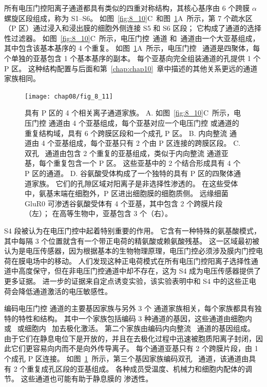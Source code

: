 所有电压门控阳离子通道都具有类似的四重对称结构，其核心基序由 6 个跨膜 $\alpha$ 螺旋区段组成，称为 S1–S6。
如图~\ref{fig:8_10}C~和图~\ref{fig:8_11}A~所示，第 7 个疏水区（P 区）通过浸入和浸出膜的细胞外侧连接 S5 和 S6 区段；
它构成了通道的选择性过滤器。
如图~\ref{fig:8_10}C~所示，电压门控~通道 和~通道由一个大亚基组成，其中包含该基本基序的 4 个重复。
如图~\ref{fig:8_11}A~所示，电压门控~ 通道是四聚体，每个单独的亚基包含 1 个基本基序的副本。
每个亚基向完全组装通道的孔提供 1 个 P 区。
这种结构配置与后面和第~\ref{chap:chap10}~章中描述的其他关系更远的通道家族相同。


\begin{figure}[htbp]
	\centering
	\texttt{[image: chap08/fig\_8\_11]}
	\caption{具有 P 区的 4 个相关离子通道家族。
		A. 如图~\ref{fig:8_10}C~所示，电压门控  通道由 4 个亚基组成，每个亚基对应一个电压门控  或通道的重复结构域，具有 6 个跨膜区段和一个成孔 P 区。
		B. 内向整流  通道由 4 个亚基组成，每个亚基只有 2 个由 P 区连接的跨膜区段。
		C. 双孔~ 通道由包含 2 个重复的亚基组成，类似于内向整流  通道亚基，每个重复包含一个 P 区。
		这些亚基中的 2 个结合形成具有 4 个 P 区的通道。
		D. 谷氨酸受体构成了一个独特的具有 P 区的四聚体通道家族。
		它们的孔隙区域对阳离子是非选择性渗透的。
		在这些受体中，氨基末端在细胞外，P 区进出细胞膜的细胞质侧。
		远缘细菌 GluR0  可渗透谷氨酸受体有 4 个亚基，其中包含 2 个跨膜片段（左）；
		在高等生物中，亚基包含 3 个（右）。}
	\label{fig:8_11}
\end{figure}


S4 段被认为在电压门控中起着特别重要的作用。
它含有一种特殊的氨基酸模式，其中每隔 3 个位置就含有一个带正电荷的精氨酸或赖氨酸残基。
这一区域最初被认为是电压传感器，因为根据基本的生物物理原理，电压门控必须涉及膜内门控电荷在膜电场中的移动。
人们发现这种正电荷模式在所有电压门控阳离子选择性通道中高度保守，但在非电压门控通道中却不存在，这为 S4 成为电压传感器提供了更多证据。
进一步的证据来自定点诱变实验，该实验表明中和 S4 中的这些正电荷会降低通道激活的电压敏感性。


编码电压门控  通道的主要基因家族与另外 3 个  通道家族相关，每个家族都具有独特的特性和结构。
其中一个家族包括编码 3 种通道的基因，这些通道由细胞内 ~ 或~ 或细胞内~ 加去极化激活。
第二个家族由编码内向整流~ 通道的基因组成。
由于它们在静息电位下是开放的，并且在去极化过程中迅速被胞质阳离子封闭，因此它们更容易向内而不是向外传导离子。
每个通道亚基只有 2 个跨膜片段，由 1 个成孔 P 区连接。
如图~\ref{fig:8_11}~所示，第三个基因家族编码双孔~ 通道，该通道由具有 2 个重复成孔区段的亚基组成。
各种成员受温度、机械力和细胞内配体的调节。
这些通道也可能有助于静息膜的  渗透性。



